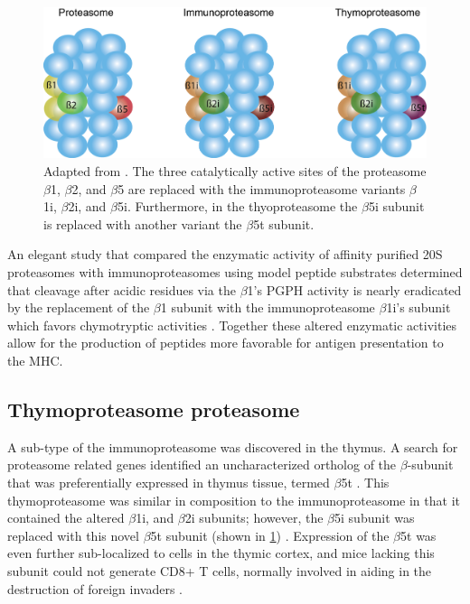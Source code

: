 \begin{figure}[p]
	\centering
	\includegraphics[width=\columnwidth]{intro/proteasome_isotypes.png}
	{Adapted from \citep{groettrup09}. The three catalytically active sites of the proteasome $\beta$1, $\beta$2, and $\beta$5 are replaced with the immunoproteasome variants $\beta$1i, $\beta$2i, and $\beta$5i. Furthermore, in the thyoproteasome the $\beta$5i subunit is replaced with another variant the $\beta$5t subunit.}
	\label{fig:proteasomeisotypes}
\end{figure}

An elegant study that compared the enzymatic activity of affinity purified 20S proteasomes with immunoproteasomes using model peptide substrates determined that cleavage after acidic residues via the $\beta$1’s PGPH activity is nearly eradicated by the replacement of the $\beta$1 subunit with the immunoproteasome $\beta$1i’s subunit which favors chymotryptic activities \citep{dahlmann00}. Together these altered enzymatic activities allow for the production of peptides more favorable for antigen presentation to the MHC. 

\subsection{Thymoproteasome proteasome}
	A sub-type of the immunoproteasome was discovered in the thymus. A search for proteasome related genes identified an uncharacterized ortholog of the $\beta$-subunit that was preferentially expressed in thymus tissue, termed $\beta$5t \citep{murata07}. This thymoproteasome was similar in composition to the immunoproteasome in that it contained the altered $\beta$1i, and $\beta$2i subunits; however, the $\beta$5i subunit was replaced with this novel $\beta$5t subunit (shown in \ref{fig:proteasomeisotypes})  \citep{murata07}. Expression of the $\beta$5t was even further sub-localized to cells in the thymic cortex, and mice lacking this subunit could not generate CD8+ T cells, normally involved in aiding in the destruction of foreign invaders \citep{murata07}. 

